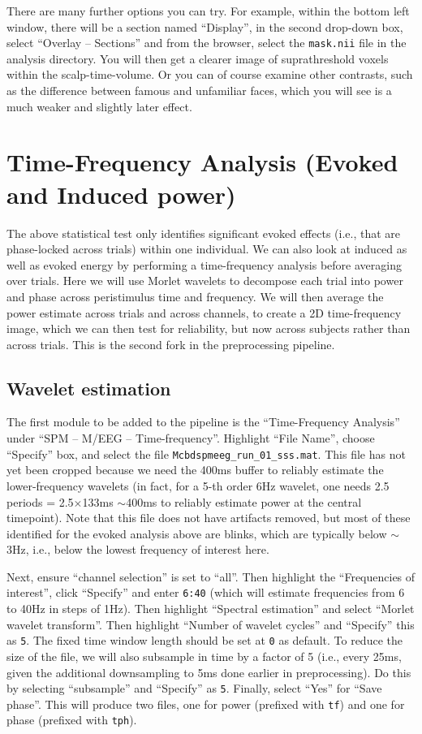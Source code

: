There are many further options you can try. For example, within the bottom left window, there will be a section named ``Display'', in the second drop-down box, select ``Overlay -- Sections'' and from the browser, select the \texttt{mask.nii} file in the analysis directory. You will then get a clearer image of suprathreshold voxels within the scalp-time-volume. Or you can of course examine other contrasts, such as the difference between famous and unfamiliar faces, which you will see is a much weaker and slightly later effect.

\section{Time-Frequency Analysis (Evoked and Induced power)}

The above statistical test only identifies significant evoked effects (i.e., that are phase-locked across trials) within one individual. We can also look at induced as well as evoked energy by performing a time-frequency analysis before averaging over trials. Here we will use Morlet wavelets to decompose each trial into power and phase across peristimulus time and frequency. We will then average the power estimate across trials and across channels, to create a 2D time-frequency image, which we can then test for reliability, but now across subjects rather than across trials. This is the second fork in the preprocessing pipeline.

\subsection{Wavelet estimation}

The first module to be added to the pipeline is the ``Time-Frequency Analysis'' under ``SPM -- M/EEG -- Time-frequency''. Highlight ``File Name'', choose ``Specify'' box, and select the file \texttt{Mcbdspmeeg\_run\_01\_sss.mat}. This file has not yet been cropped because we need the 400ms buffer to reliably estimate the lower-frequency wavelets (in fact, for a 5-th order 6Hz wavelet, one needs 2.5 periods = 2.5\(\times\)133ms \(\sim\)400ms to reliably estimate power at the central timepoint). Note that this file does not have artifacts removed, but most of these identified for the evoked analysis above are blinks, which are typically below \(\sim\)3Hz, i.e., below the lowest frequency of interest here.

Next, ensure ``channel selection'' is set to ``all''. Then highlight the ``Frequencies of interest'', click ``Specify'' and enter \texttt{6:40} (which will estimate frequencies from 6 to 40Hz in steps of 1Hz). Then highlight ``Spectral estimation'' and select ``Morlet wavelet transform''. Then highlight ``Number of wavelet cycles'' and ``Specify'' this as \texttt{5}. The fixed time window length should be set at \texttt{0} as default. To reduce the size of the file, we will also subsample in time by a factor of 5 (i.e., every 25ms, given the additional downsampling to 5ms done earlier in preprocessing). Do this by selecting ``subsample'' and ``Specify'' as \texttt{5}. Finally, select ``Yes'' for ``Save phase''. This will produce two files, one for power (prefixed with \texttt{tf}) and one for phase (prefixed with \texttt{tph}).


